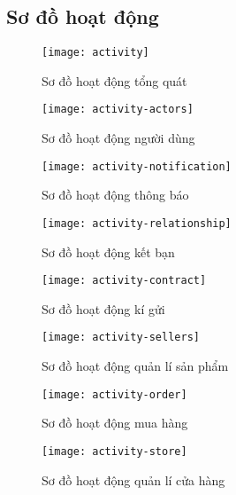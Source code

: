 \subsection{Sơ đồ hoạt động}
\begin{figure}[h!]
	\caption{Sơ đồ hoạt động tổng quát}
	\texttt{[image: activity]}
\end{figure}

\begin{figure}[h!]
	\begin{center}	
		\caption{Sơ đồ hoạt động người dùng}
		\texttt{[image: activity-actors]}
	\end{center}
\end{figure}

\begin{figure}[h!]
	\begin{center}	
		\caption{Sơ đồ hoạt động thông báo}
		\texttt{[image: activity-notification]}
	\end{center}
\end{figure}

\begin{figure}[h!]
	\begin{center}	
		\caption{Sơ đồ hoạt động kết bạn}
		\texttt{[image: activity-relationship]}
	\end{center}
\end{figure}

\begin{figure}[h!]
	\begin{center}	
		\caption{Sơ đồ hoạt động kí gửi}
		\texttt{[image: activity-contract]}
	\end{center}
\end{figure}

\begin{figure}[h!]
	\begin{center}	
		\caption{Sơ đồ hoạt động quản lí sản phẩm}
		\texttt{[image: activity-sellers]}
	\end{center}
\end{figure}

\begin{figure}[h!]
	\begin{center}	
		\caption{Sơ đồ hoạt động mua hàng}
		\texttt{[image: activity-order]}
	\end{center}
\end{figure}

\begin{figure}[h!]
	\begin{center}	
		\caption{Sơ đồ hoạt động quản lí cửa hàng}
		\texttt{[image: activity-store]}
	\end{center}
\end{figure}